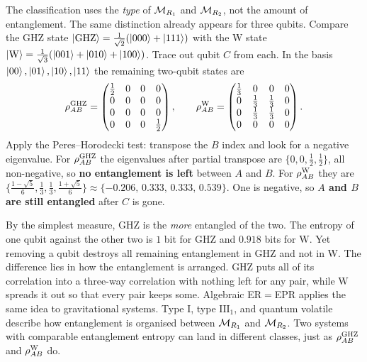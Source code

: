 \begin{physconnect}
The classification uses the \emph{type} of $\mathcal{M}_{R_1}$ and $\mathcal{M}_{R_2}$, not the amount of entanglement. The same
distinction already appears for three qubits. Compare the GHZ state
$\ket{\rm GHZ}=\tfrac1{\sqrt2}(\ket{000}+\ket{111})$ with the W state
$\ket{\rm W}=\tfrac1{\sqrt3}(\ket{001}+\ket{010}+\ket{100})$. Trace out qubit $C$ from each. In the basis
$\ket{00},\ket{01},\ket{10},\ket{11}$ the remaining two-qubit states are
\[
\rho^{\rm GHZ}_{AB} = \begin{pmatrix}\tfrac12&0&0&0\\0&0&0&0\\0&0&0&0\\0&0&0&\tfrac12\end{pmatrix}, \qquad
\rho^{\rm W}_{AB} = \begin{pmatrix}\tfrac13&0&0&0\\0&\tfrac13&\tfrac13&0\\0&\tfrac13&\tfrac13&0\\0&0&0&0\end{pmatrix} .
\]
Apply the Peres--Horodecki test: transpose the $B$ index and look for a negative eigenvalue. For
$\rho^{\rm GHZ}_{AB}$ the eigenvalues after partial transpose are $\{0,0,\tfrac12,\tfrac12\}$, all non-negative,
so \textbf{no entanglement is left} between $A$ and $B$. For $\rho^{\rm W}_{AB}$ they are
$\{\tfrac{1-\sqrt5}{6},\tfrac13,\tfrac13,\tfrac{1+\sqrt5}{6}\}\approx\{-0.206,\,0.333,\,0.333,\,0.539\}$. One is
negative, so \textbf{$A$ and $B$ are still entangled} after $C$ is gone.

By the simplest measure, GHZ is the \emph{more} entangled of the two. The entropy of one qubit against the
other two is $1$ bit for GHZ and $0.918$ bits for W. Yet removing a qubit destroys all remaining entanglement
in GHZ and not in W. The difference lies in how the entanglement is arranged. GHZ puts all of its correlation
into a three-way correlation with nothing left for any pair, while W spreads it out so that every pair keeps
some. Algebraic ER$=$EPR applies the same idea to gravitational systems. Type I, type $\mathrm{III}_1$, and
quantum volatile describe how entanglement is organised between $\mathcal{M}_{R_1}$ and $\mathcal{M}_{R_2}$. Two systems with
comparable entanglement entropy can land in different classes, just as $\rho^{\rm GHZ}_{AB}$ and
$\rho^{\rm W}_{AB}$ do.
\end{physconnect}

